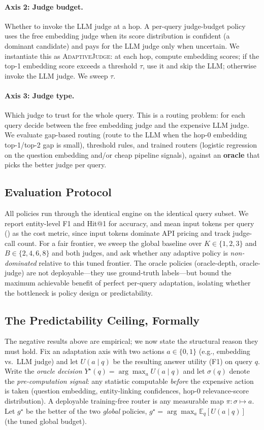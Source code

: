 \paragraph{Axis 2: Judge budget.}
Whether to invoke the LLM judge at a hop. A per-query judge-budget policy uses the free embedding judge when its score distribution is confident (a dominant candidate) and pays for the LLM judge only when uncertain. We instantiate this as \textsc{AdaptiveJudge}: at each hop, compute embedding scores; if the top-1 embedding score exceeds a threshold $\tau$, use it and skip the LLM; otherwise invoke the LLM judge. We sweep $\tau$.

\paragraph{Axis 3: Judge type.}
Which judge to trust for the whole query. This is a routing problem: for each query decide between the free embedding judge and the expensive LLM judge. We evaluate gap-based routing (route to the LLM when the hop-0 embedding top-1/top-2 gap is small), threshold rules, and trained routers (logistic regression on the question embedding and/or cheap pipeline signals), against an \textbf{oracle} that picks the better judge per query.

\subsection{Evaluation Protocol}
All policies run through the identical engine on the identical query subset. We report entity-level F1 and Hit@1 for accuracy, and mean input tokens per query (\Toks{}) as the cost metric, since input tokens dominate API pricing and track judge-call count. For a fair frontier, we sweep the global baseline over $K\in\{1,2,3\}$ and $B\in\{2,4,6,8\}$ and both judges, and ask whether any adaptive policy is \emph{non-dominated} relative to this tuned frontier. The oracle policies (oracle-depth, oracle-judge) are not deployable---they use ground-truth labels---but bound the maximum achievable benefit of perfect per-query adaptation, isolating whether the bottleneck is policy design or predictability.

\subsection{The Predictability Ceiling, Formally}
\label{sec:method-ceiling}
The negative results above are empirical; we now state the structural reason they must hold. Fix an adaptation axis with two actions $a\in\{0,1\}$ (e.g., embedding vs.\ LLM judge) and let $U(a\mid q)$ be the resulting answer utility (F1) on query $q$. Write the \emph{oracle decision} $Y^\star(q)=\arg\max_a U(a\mid q)$ and let $\sigma(q)$ denote the \emph{pre-computation signal}: any statistic computable \emph{before} the expensive action is taken (question embedding, entity-linking confidences, hop-0 relevance-score distribution). A deployable training-free router is any measurable map $\pi:\sigma\mapsto a$. Let $g^\star$ be the better of the two \emph{global} policies, $g^\star=\arg\max_a \mathbb{E}_q[U(a\mid q)]$ (the tuned global budget).

